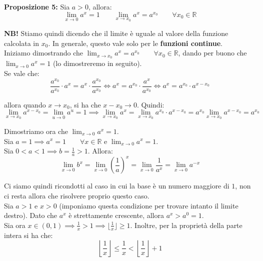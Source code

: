 \documentclass{article}
\begin{document}
\noindent\textbf{Proposizione 5:} Sia $a > 0$, allora:
\begin{equation*}
    \lim_{x \to 0} a^x = 1 \qquad \lim_{x \to x_0} a^x = a^{x_0} \qquad \forall x_0 \in \mathbb{R}
\end{equation*}

\noindent\textbf{NB!} Stiamo quindi dicendo che il limite è uguale al valore della funzione calcolata in $x_0$. In generale, questo vale solo per le \textbf{funzioni continue}.\\

\noindent Iniziamo dimostrando che $\lim_{x \to x_0} a^x = a^{x_0} \qquad \forall x_0 \in \mathbb{R}$, dando per buono che $\lim_{x \to 0} a^x = 1$ (lo dimostreremo in seguito). \\
Se vale che:
\begin{equation*}
    \frac{a^{x_0}}{a^{x_0}} \cdot a^x = a^x \cdot \frac{a^{x_0}}{a^{x_0}} \iff a^x = a^{x_0} \cdot \frac{a^x}{a^{x_0}} \iff a^x = a^{x_0} \cdot a^{x - x_0}
\end{equation*}

\noindent allora quando $x \to x_0$, si ha che $x - x_0 \to 0$. Quindi:
\begin{equation*}
    \lim_{x \to x_0} a^{x - x_0} = \lim_{u \to 0} a^u = 1 \implies \lim_{x \to x_0} a^x = \lim_{x \to x_0} a^{x_0} \cdot a^{x - x_0} = a^{x_0} \lim_{x \to x_0} a^{x - x_0} = a^{x_0}
\end{equation*}

\noindent Dimostriamo ora che $\lim_{x \to 0} a^x = 1$. \\
Sia $a = 1 \implies a^x = 1 \qquad \forall x \in \mathbb{R}$ e $\lim_{x \to 0} a^x = 1$.\\
Sia $0 < a < 1 \implies b = \frac{1}{a} > 1$. Allora:
\begin{equation*}
    \lim_{x \to 0} b^x = \lim_{x \to 0} \left(\frac{1}{a}\right)^x = \lim_{x \to 0} \frac{1}{a^x} = \lim_{x \to 0} a^{-x}
\end{equation*}

\noindent Ci siamo quindi ricondotti al caso in cui la base è un numero maggiore di $1$, non ci resta allora che risolvere proprio questo caso.\\
Sia $a > 1$ e $x > 0$ (imponiamo questa condizione per trovare intanto il limite destro). Dato che $a^x$ è strettamente crescente, allora $a^x > a^0 = 1$.\\
Sia ora $x \in (0, 1) \implies \frac{1}{x} > 1 \implies \lfloor \frac{1}{x} \rfloor \geq 1$. Inoltre, per la proprietà della parte intera si ha che:
\begin{equation*}
    \left\lfloor \frac{1}{x} \right\rfloor \leq \frac{1}{x} < \left\lfloor \frac{1}{x} \right\rfloor + 1 
\end{equation*}
\end{document}
